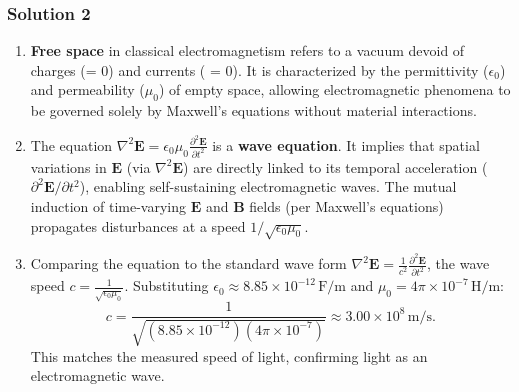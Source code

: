 \documentclass{article}
\begin{document}
\subsubsection{Solution 2}
\begin{enumerate}
    \item \textbf{Free space} in classical electromagnetism refers to a vacuum devoid of charges (\rho = 0) and currents ( = 0). It is characterized by the permittivity (\(\epsilon_0\)) and permeability (\(\mu_0\)) of empty space, allowing electromagnetic phenomena to be governed solely by Maxwell's equations without material interactions.

    \item The equation \(\nabla^2 \mathbf{E} = \epsilon_0 \mu_0 \frac{\partial^2 \mathbf{E}}{\partial t^2}\) is a \textbf{wave equation}. It implies that spatial variations in \(\mathbf{E}\) (via \(\nabla^2 \mathbf{E}\)) are directly linked to its temporal acceleration (\(\partial^2 \mathbf{E}/\partial t^2\)), enabling self-sustaining electromagnetic waves. The mutual induction of time-varying \(\mathbf{E}\) and \(\mathbf{B}\) fields (per Maxwell's equations) propagates disturbances at a speed \(1/\sqrt{\epsilon_0 \mu_0}\).

    \item Comparing the equation to the standard wave form \(\nabla^2 \mathbf{E} = \frac{1}{c^2} \frac{\partial^2 \mathbf{E}}{\partial t^2}\), the wave speed \(c = \frac{1}{\sqrt{\epsilon_0 \mu_0}}\). Substituting \(\epsilon_0 \approx 8.85 \times 10^{-12} \, \mathrm{F/m}\) and \(\mu_0 = 4\pi \times 10^{-7} \, \mathrm{H/m}\):  
    \[
    c = \frac{1}{\sqrt{(8.85 \times 10^{-12})(4\pi \times 10^{-7})}} \approx 3.00 \times 10^8 \, \mathrm{m/s}.
    \]
    This matches the measured speed of light, confirming light as an electromagnetic wave.
\end{enumerate}
\end{document}
